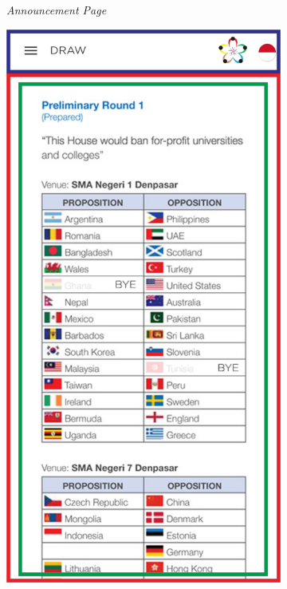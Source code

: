 \begin{figure}[H]
\begin{subfigure}[b]{0.247\textwidth}
	    \caption{{\it Announcement Page}}
	    \label{fig:announcementsPageWireframe}
     \end{subfigure}
     \hfill
     \begin{subfigure}[b]{0.24\textwidth}
    \centering
	    \includegraphics[scale=0.37]{Gambar/DrawPageWireframe.png}

\end{subfigure}
\end{figure}
